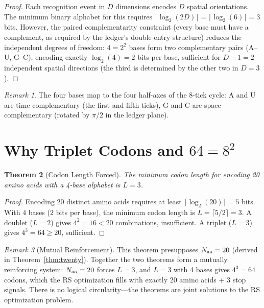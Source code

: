 \documentclass[12pt,a4paper]{article}
\newtheorem{theorem}{Theorem}[section]
\theoremstyle{definition}
\theoremstyle{remark}
\newtheorem{remark}[theorem]{Remark}
\begin{document}
\begin{proof}
Each recognition event in $D$ dimensions encodes $D$ spatial
orientations.  The minimum binary alphabet for this requires
$\lceil\log_2(2D)\rceil = \lceil\log_2(6)\rceil = 3$ bits.  However,
the paired complementarity constraint (every base must have a
complement, as required by the ledger's double-entry structure)
reduces the independent degrees of freedom: $4 = 2^2$ bases form
two complementary pairs (A--U, G--C), encoding exactly
$\log_2(4) = 2$ bits per base, sufficient for $D - 1 = 2$
independent spatial directions (the third is determined by the
other two in $D = 3$).
\end{proof}

\begin{remark}
The four bases map to the four half-axes of the 8-tick cycle: A and U
are time-complementary (the first and fifth ticks), G and C are
space-complementary (rotated by $\pi/2$ in the ledger plane).
\end{remark}

\section{Why Triplet Codons and $64 = 8^2$}
\label{sec:triplet}

\begin{theorem}[Codon Length Forced]
\label{thm:codon-length}
The minimum codon length for encoding 20 amino acids with a 4-base
alphabet is $L = 3$.
\end{theorem}

\begin{proof}
Encoding 20 distinct amino acids requires at least
$\lceil\log_2(20)\rceil = 5$ bits.  With 4 bases ($2$ bits per base),
the minimum codon length is $L = \lceil 5/2 \rceil = 3$.  A doublet
($L = 2$) gives $4^2 = 16 < 20$ combinations, insufficient.
A triplet ($L = 3$) gives $4^3 = 64 \geq 20$, sufficient.
\end{proof}

\begin{remark}[Mutual Reinforcement]
This theorem presupposes $N_{\rm aa} = 20$ (derived in
Theorem~\ref{thm:twenty}).  Together the two theorems form a
mutually reinforcing system: $N_{\rm aa} = 20$ forces $L = 3$, and
$L = 3$ with 4 bases gives $4^3 = 64$ codons, which the RS optimization
fills with exactly 20 amino acids + 3 stop signals.  There is no logical
circularity---the theorems are joint solutions to the RS optimization
problem.
\end{remark}
\end{document}
